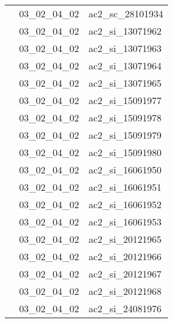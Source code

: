 \documentclass[12pt,titlepage]{book}
\begin{document}
\begin{supertabular}{|p{10cm}|c|p{15cm}|}
                    & 03\_02\_04\_02 & ac2\_sc\_28101934\\


                    & 03\_02\_04\_02 & ac2\_si\_13071962\\


                    & 03\_02\_04\_02 & ac2\_si\_13071963\\


                    & 03\_02\_04\_02 & ac2\_si\_13071964\\


                    & 03\_02\_04\_02 & ac2\_si\_13071965\\


                    & 03\_02\_04\_02 & ac2\_si\_15091977\\


                    & 03\_02\_04\_02 & ac2\_si\_15091978\\


                    & 03\_02\_04\_02 & ac2\_si\_15091979\\


                    & 03\_02\_04\_02 & ac2\_si\_15091980\\


                    & 03\_02\_04\_02 & ac2\_si\_16061950\\


                    & 03\_02\_04\_02 & ac2\_si\_16061951\\


                    & 03\_02\_04\_02 & ac2\_si\_16061952\\


                    & 03\_02\_04\_02 & ac2\_si\_16061953\\


                    & 03\_02\_04\_02 & ac2\_si\_20121965\\


                    & 03\_02\_04\_02 & ac2\_si\_20121966\\


                    & 03\_02\_04\_02 & ac2\_si\_20121967\\


                    & 03\_02\_04\_02 & ac2\_si\_20121968\\


                    & 03\_02\_04\_02 & ac2\_si\_24081976\\



\end{supertabular}
\end{document}
